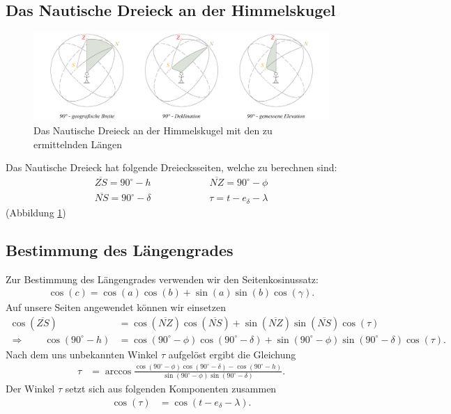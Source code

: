 \begin{refsection}
\subsection{Das Nautische Dreieck an der Himmelskugel}
%
\begin{figure}
\centering
\includegraphics[width=1\textwidth]{kugel/Bestimmung.jpg}
\caption{Das Nautische Dreieck an der Himmelskugel mit den zu ermittelnden Längen}
\label{NautischeDreieck}
\end{figure}
%
%
Das Nautische Dreieck hat folgende Dreiecksseiten, welche zu berechnen sind:
\begin{align*}
\overline{ZS} = 90^{\circ} - h \quad \quad \quad \quad \quad \quad 
\overline{NZ} = 90^{\circ} - \phi \\
\overline{NS} = 90^{\circ} - \delta \quad \quad \quad \quad \quad \quad 
\tau = t - e_\delta - \lambda 
\end{align*}
(Abbildung \ref{NautischeDreieck})

\subsection{Bestimmung des Längengrades} \label{BestimmungL} 
Zur Bestimmung des Längengrades verwenden wir den Seitenkosinussatz:
\begin{align*}
\cos(c) = \cos(a)\cos(b) + \sin(a)\sin(b)\cos(\gamma).
\end{align*}
Auf unsere Seiten angewendet können wir einsetzen
\begin{align*}
\cos(\overline{ZS}) &= \cos(\overline{NZ}) \cos(\overline{NS}) + \sin(\overline{NZ}) \sin(\overline{NS}) \cos(\tau) \\
\Rightarrow \quad \quad
\cos(90^{\circ} - h) &= \cos(90^{\circ} - \phi) \cos(90^{\circ} - \delta) + \sin(90^{\circ} - \phi)\sin(90^{\circ} - \delta) \cos(\tau).
\end{align*}
Nach dem uns unbekannten Winkel $\tau$ aufgelöst ergibt die Gleichung
\begin{align*}
\tau &= \arccos 
\frac{ \cos(90^{\circ} - \phi) \cos(90^{\circ} - \delta) - \cos(90^{\circ} - h)} {\sin(90^{\circ} - \phi)\sin(90^{\circ} - \delta)}.
\end{align*}
Der Winkel $\tau$ setzt sich aus folgenden Komponenten zusammen
\begin{align*}
\cos (\tau) &= \cos (t - e_\delta - \lambda).
\end{align*}


\end{refsection}
